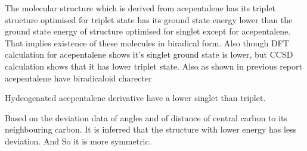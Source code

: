 \documentclass{article}
\begin{document}
The molecular structure which is derived from acepentalene has its triplet structure optimised for triplet state has its ground state energy lower than the ground state energy of structure optimised for singlet except for acepentalene. That implies existence of these molecules in biradical form. Also though DFT calculation for acepentalene shows it's singlet ground state is lower, but CCSD calculation shows that it has lower triplet state. Also as shown in previous report acepentalene have biradicaloid charecter 

Hydeogenated acepentalene derivative have a lower singlet than triplet. 

Based on the deviation data of angles and of distance of central carbon to its neighbouring carbon. It is inferred that the structure with lower energy has less deviation. And So it is more symmetric. 
\fi




\end{document}
